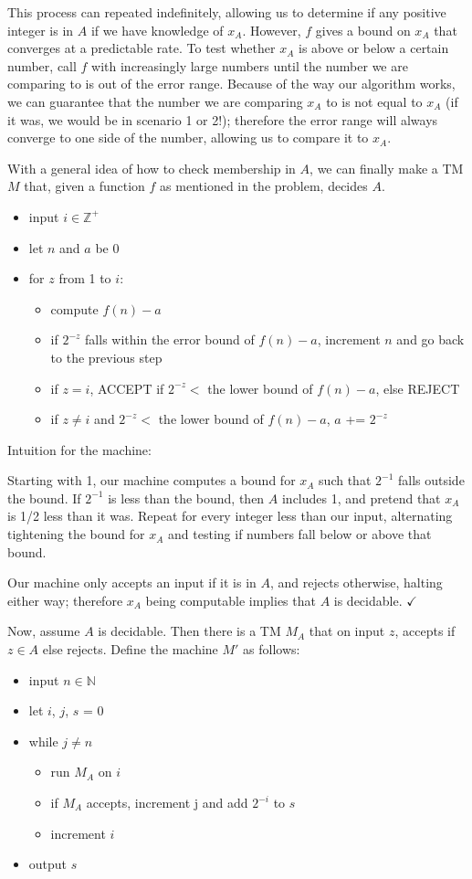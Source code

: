 \documentclass[11pt]{article}
\begin{document}
This process can repeated indefinitely, allowing us to determine if any positive integer is in $A$ if we have knowledge of $x_A$.
However, $f$ gives a bound on $x_A$ that converges at a predictable rate.
To test whether $x_A$ is above or below a certain number, call $f$ with increasingly large numbers until the number we are comparing to is out of the error range.
Because of the way our algorithm works, we can guarantee that the number we are comparing $x_A$ to is not equal to $x_A$ (if it was, we would be in scenario 1 or 2!); therefore the error range will always converge to one side of the number, allowing us to compare it to $x_A$.

With a general idea of how to check membership in $A$, we can finally make a TM $M$ that, given a function $f$ as mentioned in the problem, decides $A$.
\begin{itemize}
	\item input $i \in \mathbb{Z}^+$
	\item let $n$ and $a$ be 0
	\item for $z$ from 1 to $i$:
		\begin{itemize}
			\item compute $f(n) -a$
			\item if $2^{-z}$ falls within the error bound of $f(n)-a$, increment $n$ and go back to the previous step 
			\item if $z =i$, ACCEPT if $2^{-z} < $ the lower bound of $f(n)-a$, else REJECT
			\item if $z \neq i$ and $2^{-z} <$ the lower bound of $f(n)-a$, $a$ += $2^{-z}$
		\end{itemize}
\end{itemize}

Intuition for the machine:

Starting with 1, our machine computes a bound for $x_A$ such that $2^{-1}$ falls outside the bound.
If $2^{-1}$ is less than the bound, then $A$ includes 1, and pretend that $x_A$ is 1/2 less than it was.
Repeat for every integer less than our input, alternating tightening the bound for $x_A$ and testing if numbers fall below or above that bound.

Our machine only accepts an input if it is in $A$, and rejects otherwise, halting either way; therefore $x_A$ being computable implies that $A$ is decidable. $\checkmark$

Now, assume $A$ is decidable.
Then there is a TM $M_A$ that on input $z$, accepts if $z \in A$ else rejects.
Define the machine $M'$ as follows:
\begin{itemize}
	\item input $n \in \mathbb{N}$
	\item let $i$, $j$, $s$ = 0
	\item while $j \neq n$
		\begin{itemize}
			\item run $M_A$ on $i$
			\item if $M_A$ accepts, increment j and add $2^{-i}$ to $s$
			\item increment $i$
		\end{itemize}
	\item output $s$
\end{itemize}
\end{document}
